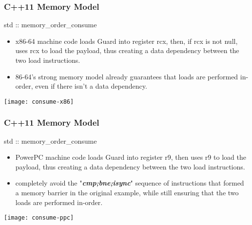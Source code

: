 \begin{frame}
    \frametitle{C++11 Memory Model}
    \LARGE
    std :: memory\_order\_consume
    
    
    \large
    \begin{itemize}
        \item x86-64 machine code loads Guard into register rcx, then, if rcx is not null, uses rcx to load the payload, thus creating a data dependency between the two load instructions. 
        \item 86-64’s strong memory model already guarantees that loads are performed in-order, even if there isn’t a data dependency.
    \end{itemize}



    
    \texttt{[image: consume-x86]}
\end{frame}

\begin{frame}
    \frametitle{C++11 Memory Model}
    \LARGE
    std :: memory\_order\_consume
    
    
    \large
    \begin{itemize}
        \item PowerPC machine code loads Guard into register r9, then uses r9 to load the payload, thus creating a data dependency between the two load instructions. 
        \item completely avoid the "\textit{\textbf{cmp;bne;isync}}" sequence of instructions that formed a memory barrier in the original example, while still ensuring that the two loads are performed in-order.
    \end{itemize}

    \texttt{[image: consume-ppc]}
\end{frame}

